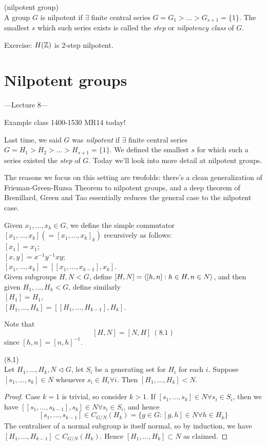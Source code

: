 \documentclass[a4paper]{article}
\begin{document}
\begin{defi} (nilpotent group)\\
A group $G$ is nilpotent if $\exists$ finite central series $G=G_1 >...>G_{s+1} = \{1\}$. The smallest $s$ which such series exists is called the \emph{step} or \emph{nilpotency class} of $G$.
\end{defi}

Exercise: $H(\mathbb{Z})$ is $2$-step nilpotent. 

\newpage

\section{Nilpotent groups}

---Lecture 8---

Example class 1400-1530 MR14 today!

Last time, we said $G$ was \emph{nilpotent} if $\exists $ finite central series $G=H_1 > H_2 > ... >H_{s+1} = \{1\}$. We defined the smallest $s$ for which such a series existed the \emph{step} of $G$. Today we'll look into more detail at nilpotent groups.

The reasons we focus on this setting are twofolds: there's a clean generalization of Frieman-Green-Ruzsa Theorem to nilpotent groups, and a deep theorem of Brenillard, Green and Tao essentially reduces the general case to the nilpotent case.

Given $x_1,...,x_k \in G$, we define the simple commutator $[x_1,...,x_k] (= [x_1,...,x_k]_k) $ recursively as follows:\\
$[x_1] = x_1$;\\
$[x,y] = x^{-1}y^{-1}xy$;\\
$[x_1,...,x_k] = [[x_1,...,x_{k-1}],x_k]$.\\
Given subgroups $H,N < G$, define $[H,N] = \langle[h,n]:h \in H,n \in N\rangle$, and then given $H_1,...,H_k <G$, define similarly\\
$[H_1] = H_1$,\\
$[H_1,...,H_k] = [[H_1,...,H_{k-1}],H_k]$.

Note that
\[
[H,N] = [N,H] \ (8.1)
\]
since $[h,n] = [n,h]^{-1}$.

\begin{lemma} (8.1)\\
Let $H_1,...,H_k,N \triangleleft G$, let $S_i$ be a generating set for $H_i$ for each $i$. Suppose $[s_1,...,s_k] \in N$ whenever $s_i \in H_i \forall i$. Then $[H_1,...,H_k] < N$.
\begin{proof}
Case $k=1$ is trivial, so consider $k>1$. If $[s_1,...,s_k] \in N \forall s_i \in S_i$, then we have $[[s_1,...,s_{k-1}],s_k] \in N \forall s_i \in S_i$, and hence 
\[
[s_1,...,s_{k-1}] \in C_{G/N} (H_k) = \{g \in G: [g,h] \in N \forall h \in H_k\}
\]
The centraliser of a normal subgroup is itself normal, so by induction, we have $[H_1,...,H_{k-1}] \subset C_{G/N} (H_k)$. Hence $[H_1,...,H_k] \subset N$ as claimed.
\end{proof}
\end{lemma}
\end{document}
